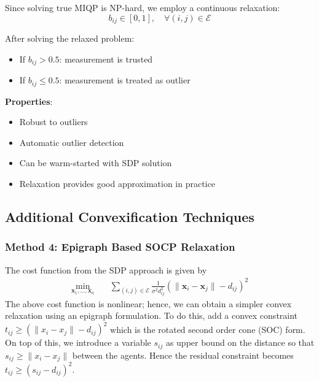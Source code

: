\documentclass[11pt,a4paper]{article}
\begin{document}
Since solving true MIQP is NP-hard, we employ a continuous relaxation:
\begin{equation}
b_{ij} \in [0, 1], \quad \forall (i,j) \in \mathcal{E}
\end{equation}

After solving the relaxed problem:
\begin{itemize}
    \item If $b_{ij} > 0.5$: measurement is trusted
    \item If $b_{ij} \leq 0.5$: measurement is treated as outlier
\end{itemize}

\textbf{Properties}:
\begin{itemize}
    \item Robust to outliers
    \item Automatic outlier detection
    \item Can be warm-started with SDP solution
    \item Relaxation provides good approximation in practice
\end{itemize}

\subsection{Additional Convexification Techniques}

\subsubsection{Method 4: Epigraph Based SOCP Relaxation}

The cost function from the SDP approach is given by
\begin{equation*}
\begin{aligned}
\min_{\mathbf{x}_1, \ldots, \mathbf{x}_n} \quad & \sum_{(i,j) \in \mathcal{E}} \frac{1}{\sigma^2 d_{ij}^2} \left(\|\mathbf{x}_i - \mathbf{x}_j\| - d_{ij}\right)^2
\end{aligned}
\end{equation*}
The above cost function is nonlinear; hence, we can obtain a simpler convex relaxation using an epigraph formulation.  To do this, add a convex constraint $t_{ij}\geq (\|x_i - x_j \| - d_{ij})^2$ which is the rotated second order cone (SOC) form. 
 On top of this, we introduce a variable $s_{ij}$ as upper bound on the distance so that $s_{ij} \geq \|x_i - x_j \|$ between the agents.
 Hence the residual constraint becomes $t_{ij}\geq (s_{ij}- d_{ij})^2$.
\end{document}
